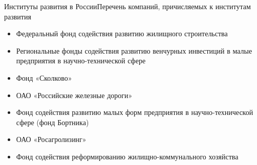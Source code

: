 \documentclass[_Venture_p3.tex]{subfiles}
\begin{document}
\begin{frame}[allowframebreaks]{Институты развития в России}{Перечень компаний, причисляемых к институтам развития}
\begin{itemize}
	\pagebreak
	\item Федеральный фонд содействия развитию жилищного строительства 
	\item Региональные фонды содействия развитию венчурных инвестиций в малые предприятия в научно-технической сфере
	\item Фонд «Сколково»

	\pagebreak
	\item ОАО «Российские железные дороги»
	\item Фонд содействия развитию малых форм предприятия в научно-технической сфере (фонд Бортника)

	\pagebreak
	\item ОАО «Росагролизинг»
	\item Фонд содействия реформированию жилищно-коммунального хозяйства
\end{itemize}
\end{frame}
\end{document}
